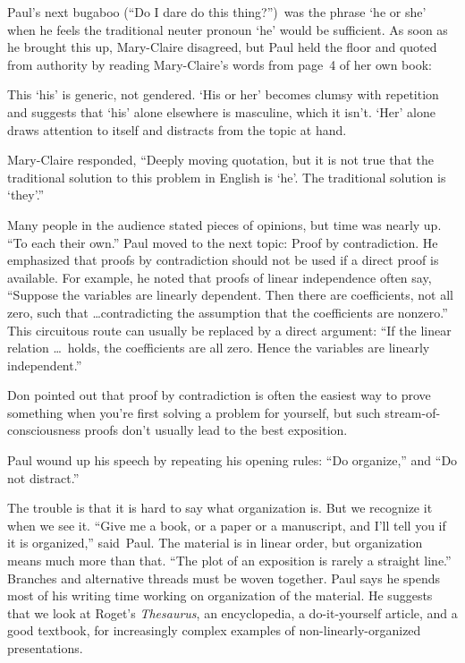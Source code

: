 Paul's next bugaboo (``Do I dare do this thing?'')\
was the phrase `he or she' when he feels the traditional neuter
pronoun `he' would
be sufficient.  As soon as he brought this up, Mary-Claire disagreed, but
Paul held the floor and quoted from authority by reading Mary-Claire's words
from page~4 of her own book:

{\narrower\par\nobreak\smallskip\noindent
	This `his' is generic, not gendered.  `His or her' becomes clumsy 
	with repetition and suggests that `his' alone elsewhere is masculine, 
	which it isn't.   `Her' alone draws attention to itself and distracts 
	from the topic at hand. 
\smallskip}

Mary-Claire responded, ``Deeply moving quotation, but it is not true that
the traditional solution to this problem in English is `he'.  The
traditional solution is `they'.''

Many people in the audience stated pieces of opinions, but time was nearly up.
``To each their own.''
Paul moved to
the next topic: Proof by contradiction.  He emphasized that proofs
by contradiction should not be used if a direct proof is available. 
For example, he noted that proofs of linear independence often say, 
``Suppose the variables are linearly dependent. Then there are coefficients,
not all zero, such that \dots contradicting the assumption that the
coefficients are nonzero.''
This circuitous route can usually be replaced by a direct argument:
``If the linear relation \dots \  holds, the coefficients are all zero.
Hence the variables are linearly independent.''

Don pointed out that proof by
contradiction is often the easiest way to prove something when you're
first solving a problem for yourself, but such stream-of-consciousness
proofs don't usually lead to the best exposition.

Paul wound up his speech by repeating his opening rules: ``Do organize,'' and
``Do not distract.''

The trouble is that it is hard to say what organization is.  But
we recognize it when we see it. ``Give me a
book, or a paper or a manuscript,
and I'll tell you if it is organized,'' said~Paul. The material is in
linear order, but organization means much more than that. ``The plot
of an exposition is rarely a straight line.'' Branches and alternative
threads must be woven together. Paul says he spends most of his writing time
working on organization of the material.
He suggests that we
look at Roget's {\sl Thesaurus}, an encyclopedia, a do-it-yourself article, and
a good textbook, for increasingly complex examples of 
 non-linearly-organized
presentations.

